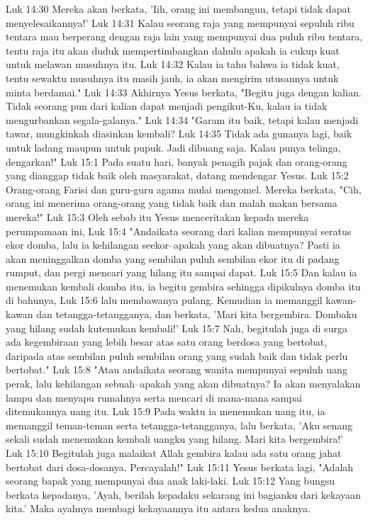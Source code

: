 Luk 14:30  Mereka akan berkata, 'Iih, orang ini membangun, tetapi tidak dapat menyelesaikannya!'
Luk 14:31  Kalau seorang raja yang mempunyai sepuluh ribu tentara mau berperang dengan raja lain yang mempunyai dua puluh ribu tentara, tentu raja itu akan duduk mempertimbangkan dahulu apakah ia cukup kuat untuk melawan musuhnya itu.
Luk 14:32  Kalau ia tahu bahwa ia tidak kuat, tentu sewaktu musuhnya itu masih jauh, ia akan mengirim utusannya untuk minta berdamai."
Luk 14:33  Akhirnya Yesus berkata, "Begitu juga dengan kalian. Tidak seorang pun dari kalian dapat menjadi pengikut-Ku, kalau ia tidak mengurbankan segala-galanya."
Luk 14:34  "Garam itu baik, tetapi kalau menjadi tawar, mungkinkah diasinkan kembali?
Luk 14:35  Tidak ada gunanya lagi, baik untuk ladang maupun untuk pupuk. Jadi dibuang saja. Kalau punya telinga, dengarkan!"
Luk 15:1  Pada suatu hari, banyak penagih pajak dan orang-orang yang dianggap tidak baik oleh masyarakat, datang mendengar Yesus.
Luk 15:2  Orang-orang Farisi dan guru-guru agama mulai mengomel. Mereka berkata, "Cih, orang ini menerima orang-orang yang tidak baik dan malah makan bersama mereka!"
Luk 15:3  Oleh sebab itu Yesus menceritakan kepada mereka perumpamaan ini,
Luk 15:4  "Andaikata seorang dari kalian mempunyai seratus ekor domba, lalu ia kehilangan seekor--apakah yang akan dibuatnya? Pasti ia akan meninggalkan domba yang sembilan puluh sembilan ekor itu di padang rumput, dan pergi mencari yang hilang itu sampai dapat.
Luk 15:5  Dan kalau ia menemukan kembali domba itu, ia begitu gembira sehingga dipikulnya domba itu di bahunya,
Luk 15:6  lalu membawanya pulang. Kemudian ia memanggil kawan-kawan dan tetangga-tetangganya, dan berkata, 'Mari kita bergembira. Dombaku yang hilang sudah kutemukan kembali!'
Luk 15:7  Nah, begitulah juga di surga ada kegembiraan yang lebih besar atas satu orang berdosa yang bertobat, daripada atas sembilan puluh sembilan orang yang sudah baik dan tidak perlu bertobat."
Luk 15:8  "Atau andaikata seorang wanita mempunyai sepuluh uang perak, lalu kehilangan sebuah--apakah yang akan dibuatnya? Ia akan menyalakan lampu dan menyapu rumahnya serta mencari di mana-mana sampai ditemukannya uang itu.
Luk 15:9  Pada waktu ia menemukan uang itu, ia memanggil teman-teman serta tetangga-tetangganya, lalu berkata, 'Aku senang sekali sudah menemukan kembali uangku yang hilang. Mari kita bergembira!'
Luk 15:10  Begitulah juga malaikat Allah gembira kalau ada satu orang jahat bertobat dari dosa-dosanya. Percayalah!"
Luk 15:11  Yesus berkata lagi, "Adalah seorang bapak yang mempunyai dua anak laki-laki.
Luk 15:12  Yang bungsu berkata kepadanya, 'Ayah, berilah kepadaku sekarang ini bagianku dari kekayaan kita.' Maka ayahnya membagi kekayaannya itu antara kedua anaknya.
